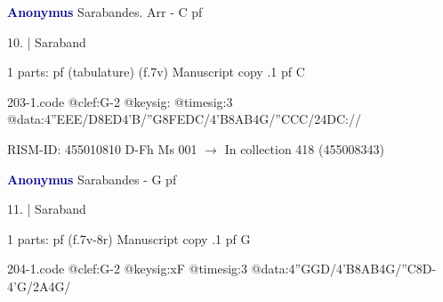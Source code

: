 \documentclass[twocolumn]{book}
\begin{document}
\newline \par \vspace{7pt} \textcolor{darkblue}{\textbf{Anonymus  }}
\newline Sarabandes. Arr - C
\newline pf
\newline \begin{itshape}[f.7v, at left:] 10. | Saraband\end{itshape} 
\newline \textcolor{darkblue}{}  1 parts: pf (tabulature)  (f.7v)
\newline Manuscript copy
.1  pf  C  
\begin{filecontents*}{203-1.code}
@clef:G-2
@keysig:
@timesig:3
@data:4''EEE/D{8ED}4'B/''G{8FEDC}/4'B{8AB}4G/''CCC/24DC://
\end{filecontents*}
\newline
%

\newline RISM-ID: 455010810
\newline D-Fh  Ms 001
\newline $\rightarrow$ In collection 418 (455008343)
      
\newline \par \vspace{7pt} \textcolor{darkblue}{\textbf{Anonymus  }}
\newline Sarabandes - G
\newline pf
\newline \begin{itshape}[f.7v, at left:] 11. | Saraband\end{itshape} 
\newline \textcolor{darkblue}{}  1 parts: pf  (f.7v-8r)
\newline Manuscript copy
.1  pf  G  
\begin{filecontents*}{204-1.code}
@clef:G-2
@keysig:xF
@timesig:3
@data:4''GGD/4'B{8AB}4G/''C8D-4'G/2A4G/
\end{filecontents*}
\newline
%
\end{document}
